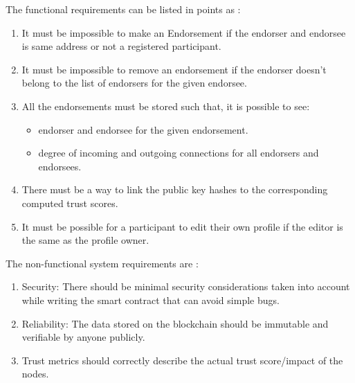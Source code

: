 The functional requirements can be listed in points as : \\
\begin{enumerate}
	\item It must be impossible to make an Endorsement if the endorser and
		endorsee is same address or not a registered participant.
	\item It must be impossible to remove an endorsement if the endorser
		doesn't belong to the list of endorsers for the given endorsee.
	\item All the endorsements must be stored such that, it is possible to see: 
		\begin{itemize}
			\item endorser and endorsee for the given endorsement.
			\item degree of incoming and outgoing connections for all endorsers and endorsees.
		\end{itemize}
	\item There must be a way to link the public key hashes to the
		corresponding computed trust scores. 
	\item It must be possible for a participant to edit their own profile if
		the editor is the same as the profile owner. 
\end{enumerate}

The non-functional system requirements are : 
\begin{enumerate}
	\item Security: There should be minimal security considerations taken into
		account while writing the smart contract that can avoid simple bugs.  
	\item Reliability: The data stored on the blockchain should be immutable
		and verifiable by anyone publicly.
	\item Trust metrics should correctly describe the actual trust score/impact of the nodes.  
\end{enumerate}

